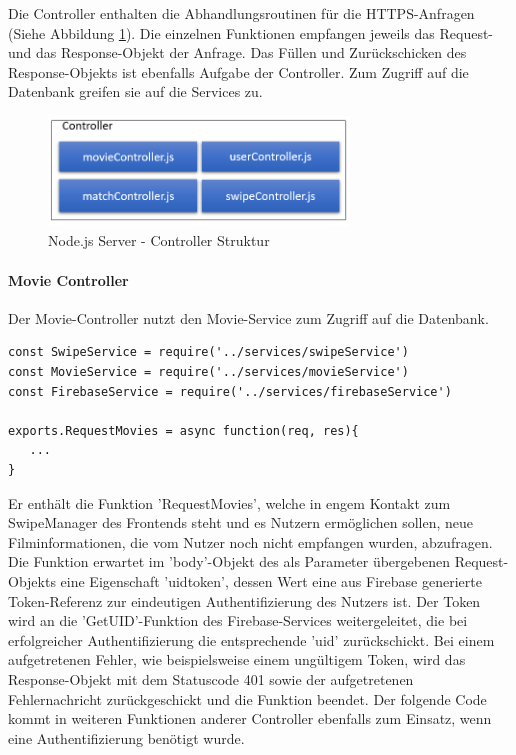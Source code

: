 Die Controller enthalten die Abhandlungsroutinen für die HTTPS-Anfragen (Siehe Abbildung \ref{ControllerStruktur}). Die einzelnen Funktionen empfangen jeweils das Request- und das Response-Objekt der Anfrage. Das Füllen und Zurückschicken des Response-Objekts ist ebenfalls Aufgabe der Controller. Zum Zugriff auf die Datenbank greifen sie auf die Services zu.



\begin{figure}[h]
\centering
\includegraphics[width=8cm]{images/controllerStruktur.PNG}
\caption{Node.js Server - Controller Struktur}
\label{ControllerStruktur}
\end{figure}

\paragraph{Movie Controller}

Der Movie-Controller nutzt den Movie-Service zum Zugriff auf die Datenbank. 
\begin{lstlisting}[caption=movieController.js Imports und Funktionen, label=lst:movieController.js]
const SwipeService = require('../services/swipeService')
const MovieService = require('../services/movieService')
const FirebaseService = require('../services/firebaseService')

exports.RequestMovies = async function(req, res){
   ...
}
\end{lstlisting}

\noindent
Er enthält die Funktion 'RequestMovies', welche in engem Kontakt zum SwipeManager des Frontends steht und es Nutzern ermöglichen sollen, neue Filminformationen, die vom Nutzer noch nicht empfangen wurden, abzufragen.
\newline
Die Funktion erwartet im 'body'-Objekt des als Parameter übergebenen Request-Objekts eine Eigenschaft 'uidtoken', dessen Wert eine aus Firebase generierte Token-Referenz zur eindeutigen Authentifizierung des Nutzers ist. Der Token wird an die 'GetUID'-Funktion des Firebase-Services weitergeleitet, die bei erfolgreicher Authentifizierung die entsprechende 'uid' zurückschickt. Bei einem aufgetretenen Fehler, wie beispielsweise einem ungültigem Token, wird das Response-Objekt mit dem Statuscode 401 sowie der aufgetretenen Fehlernachricht zurückgeschickt und die Funktion beendet. Der folgende Code kommt in weiteren Funktionen anderer Controller ebenfalls zum Einsatz, wenn eine Authentifizierung benötigt wurde.

